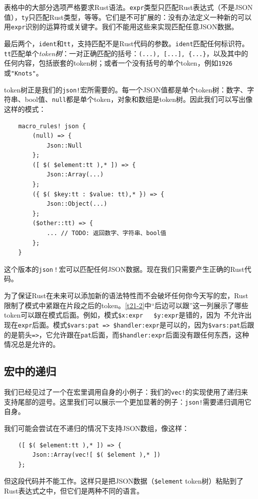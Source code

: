 表格中的大部分选项严格要求Rust语法。\texttt{expr}类型只匹配Rust表达式（不是JSON值），\texttt{ty}只匹配Rust类型，等等。它们是不可扩展的：没有办法定义一种新的可以用\texttt{expr}识别的运算符或关键字。我们不能用这些来实现匹配任意JSON数据。

最后两个，\texttt{ident}和\texttt{tt}，支持匹配不是Rust代码的参数。\texttt{ident}匹配任何标识符。\texttt{tt}匹配单个\emph{token树}：一对正确匹配的括号：\texttt{(...), [...], \{...\}}，以及其中的任何内容，包括嵌套的token树；或者一个没有括号的单个token，例如\texttt{1926}或\texttt{"Knots"}。

token树正是我们的\texttt{json!}宏所需要的。每一个JSON值都是单个token树：数字、字符串、bool值、\texttt{null}都是单个token，对象和数组是token树。因此我们可以写出像这样的模式：
\begin{verbatim}
    macro_rules! json {
        (null) => {
            Json::Null
        };
        ([ $( $element:tt ),* ]) => {
            Json::Array(...)
        };
        ({ $( $key:tt : $value: tt),* }) => {
            Json::Object(...)
        };
        ($other::tt) => {
            ... // TODO: 返回数字、字符串、bool值
        };
    }
\end{verbatim}

这个版本的\texttt{json！}宏可以匹配任何JSON数据。现在我们只需要产生正确的Rust代码。

为了保证Rust在未来可以添加新的语法特性而不会破坏任何你今天写的宏，Rust限制了模式中紧跟在片段之后的token。\autoref{t21-2}中“后边可以跟”这一列展示了哪些token可以跟在模式后面。例如，模式\texttt{\$x:expr ~ \$y:expr}是错的，因为\texttt{~}不允许出现在\texttt{expr}后面。模式\texttt{\$vars:pat => \$handler:expr}是可以的，因为\texttt{\$vars:pat}后跟的是箭头\texttt{=>}，它允许跟在\texttt{pat}后面，而\texttt{\$handler:expr}后面没有跟任何东西，这种情况总是允许的。

\subsection{宏中的递归}
我们已经见过了一个在宏里调用自身的小例子：我们的\texttt{vec!}的实现使用了递归来支持尾部的逗号。这里我们可以展示一个更加显著的例子：\texttt{json!}需要递归调用它自身。

我们可能会尝试在不递归的情况下支持JSON数组，像这样：
\begin{verbatim}
    ([ $( $element:tt ),* ]) => {
        Json::Array(vec![ $( $element ),* ])
    };
\end{verbatim}
但这段代码并不能工作。这样只是把JSON数据（\texttt{\$element} token树）粘贴到了Rust表达式之中，但它们是两种不同的语言。

